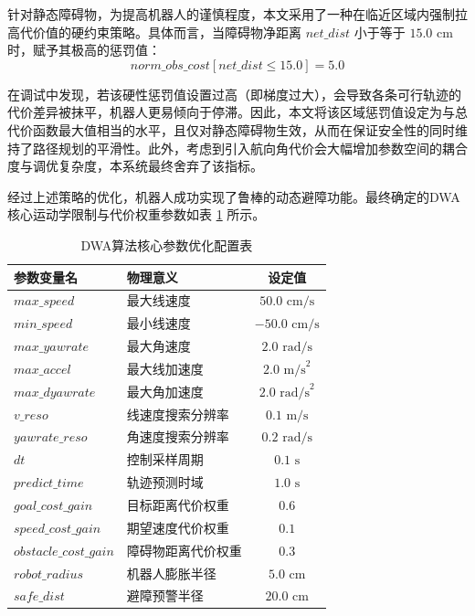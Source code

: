 针对静态障碍物，为提高机器人的谨慎程度，本文采用了一种在临近区域内强制拉高代价值的硬约束策略。具体而言，当障碍物净距离 $net\_dist$ 小于等于 $15.0\text{ cm}$ 时，赋予其极高的惩罚值：
\begin{equation}
norm\_obs\_cost[net\_dist \le 15.0] = 5.0
\end{equation}

在调试中发现，若该硬性惩罚值设置过高（即梯度过大），会导致各条可行轨迹的代价差异被抹平，机器人更易倾向于停滞。因此，本文将该区域惩罚值设定为与总代价函数最大值相当的水平，且仅对静态障碍物生效，从而在保证安全性的同时维持了路径规划的平滑性。此外，考虑到引入航向角代价会大幅增加参数空间的耦合度与调优复杂度，本系统最终舍弃了该指标。

经过上述策略的优化，机器人成功实现了鲁棒的动态避障功能。最终确定的DWA核心运动学限制与代价权重参数如表 \ref{tab:dwa_params} 所示。

\begin{table}[H]
    \centering
    \caption{DWA算法核心参数优化配置表}
    \label{tab:dwa_params}
    \begin{tabular}{llc}
        \toprule
        \textbf{参数变量名} & \textbf{物理意义} & \textbf{设定值} \\
        \midrule
        $max\_speed$ & 最大线速度 & $50.0 \text{ cm/s}$ \\
        $min\_speed$ & 最小线速度 & $-50.0 \text{ cm/s}$ \\
        $max\_yawrate$ & 最大角速度 & $2.0 \text{ rad/s}$ \\
        $max\_accel$ & 最大线加速度 & $2.0 \text{ m/s}^2$ \\
        $max\_dyawrate$ & 最大角加速度 & $2.0 \text{ rad/s}^2$ \\
        $v\_reso$ & 线速度搜索分辨率 & $0.1 \text{ m/s}$ \\
        $yawrate\_reso$ & 角速度搜索分辨率 & $0.2 \text{ rad/s}$ \\
        $dt$ & 控制采样周期 & $0.1 \text{ s}$ \\
        $predict\_time$ & 轨迹预测时域 & $1.0 \text{ s}$ \\
        $goal\_cost\_gain$ & 目标距离代价权重 & $0.6$ \\
        $speed\_cost\_gain$ & 期望速度代价权重 & $0.1$ \\
        $obstacle\_cost\_gain$ & 障碍物距离代价权重 & $0.3$ \\
        $robot\_radius$ & 机器人膨胀半径 & $5.0 \text{ cm}$ \\
        $safe\_dist$ & 避障预警半径 & $20.0 \text{ cm}$ \\
        \bottomrule
    \end{tabular}
\end{table}

